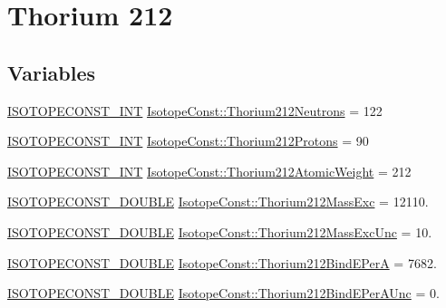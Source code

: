 \hypertarget{group___isotope_const-_thorium-_th212}{}\section{Thorium 212}
\label{group___isotope_const-_thorium-_th212}
\subsection*{Variables}
\begin{DoxyCompactItemize}
\item 
\mbox{\hyperlink{group___isotope_const-_macros_ga5f18360b3e99483a35c32d789e62621c}{I\+S\+O\+T\+O\+P\+E\+C\+O\+N\+S\+T\+\_\+\+I\+NT}} \mbox{\hyperlink{group___isotope_const-_thorium-_th212_ga4dc81fd31cd92f9a22c70ffdca63a104}{Isotope\+Const\+::\+Thorium212\+Neutrons}} = 122
\item 
\mbox{\hyperlink{group___isotope_const-_macros_ga5f18360b3e99483a35c32d789e62621c}{I\+S\+O\+T\+O\+P\+E\+C\+O\+N\+S\+T\+\_\+\+I\+NT}} \mbox{\hyperlink{group___isotope_const-_thorium-_th212_gaf5abb69f60aaae4bb08090860c333322}{Isotope\+Const\+::\+Thorium212\+Protons}} = 90
\item 
\mbox{\hyperlink{group___isotope_const-_macros_ga5f18360b3e99483a35c32d789e62621c}{I\+S\+O\+T\+O\+P\+E\+C\+O\+N\+S\+T\+\_\+\+I\+NT}} \mbox{\hyperlink{group___isotope_const-_thorium-_th212_ga4400205486e2155a2347622d73fec85c}{Isotope\+Const\+::\+Thorium212\+Atomic\+Weight}} = 212
\item 
\mbox{\hyperlink{group___isotope_const-_macros_ga8f45a7272ce02c0b4c65c44636ed719a}{I\+S\+O\+T\+O\+P\+E\+C\+O\+N\+S\+T\+\_\+\+D\+O\+U\+B\+LE}} \mbox{\hyperlink{group___isotope_const-_thorium-_th212_gadc2634bf782ae4b71649eaacdd5e9699}{Isotope\+Const\+::\+Thorium212\+Mass\+Exc}} = 12110.
\item 
\mbox{\hyperlink{group___isotope_const-_macros_ga8f45a7272ce02c0b4c65c44636ed719a}{I\+S\+O\+T\+O\+P\+E\+C\+O\+N\+S\+T\+\_\+\+D\+O\+U\+B\+LE}} \mbox{\hyperlink{group___isotope_const-_thorium-_th212_ga60985a023d9648a3ff656536ceb52107}{Isotope\+Const\+::\+Thorium212\+Mass\+Exc\+Unc}} = 10.
\item 
\mbox{\hyperlink{group___isotope_const-_macros_ga8f45a7272ce02c0b4c65c44636ed719a}{I\+S\+O\+T\+O\+P\+E\+C\+O\+N\+S\+T\+\_\+\+D\+O\+U\+B\+LE}} \mbox{\hyperlink{group___isotope_const-_thorium-_th212_ga8afe8f6debab2036f5f2570352726593}{Isotope\+Const\+::\+Thorium212\+Bind\+E\+PerA}} = 7682.
\item 
\mbox{\hyperlink{group___isotope_const-_macros_ga8f45a7272ce02c0b4c65c44636ed719a}{I\+S\+O\+T\+O\+P\+E\+C\+O\+N\+S\+T\+\_\+\+D\+O\+U\+B\+LE}} \mbox{\hyperlink{group___isotope_const-_thorium-_th212_ga0e5686dbd54b544ade4dfedc295fabe8}{Isotope\+Const\+::\+Thorium212\+Bind\+E\+Per\+A\+Unc}} = 0.

\end{DoxyCompactItemize}
